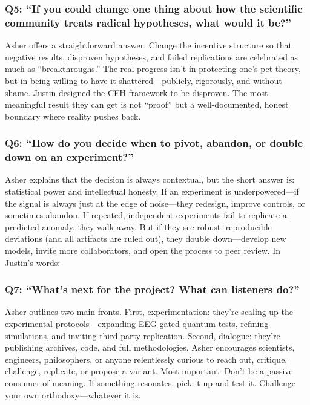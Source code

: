 \documentclass{report}
\begin{document}
\subsubsection*{Q5: ``If you could change one thing about how the scientific community treats radical hypotheses, what would it be?''}
Asher offers a straightforward answer: Change the incentive structure so that negative results, disproven hypotheses, and failed replications are celebrated as much as “breakthroughs.” The real progress isn’t in protecting one’s pet theory, but in being willing to have it shattered—publicly, rigorously, and without shame. Justin designed the CFH framework to be disproven. The most meaningful result they can get is not “proof” but a well-documented, honest boundary where reality pushes back.

\subsubsection*{Q6: ``How do you decide when to pivot, abandon, or double down on an experiment?''}
Asher explains that the decision is always contextual, but the short answer is: statistical power and intellectual honesty. If an experiment is underpowered—if the signal is always just at the edge of noise—they redesign, improve controls, or sometimes abandon. If repeated, independent experiments fail to replicate a predicted anomaly, they walk away. But if they see robust, reproducible deviations (and all artifacts are ruled out), they double down—develop new models, invite more collaborators, and open the process to peer review. In Justin’s words:

\subsubsection*{Q7: ``What’s next for the project? What can listeners do?''}
Asher outlines two main fronts. First, experimentation: they’re scaling up the experimental protocols—expanding EEG-gated quantum tests, refining simulations, and inviting third-party replication. Second, dialogue: they’re publishing archives, code, and full methodologies. Asher encourages scientists, engineers, philosophers, or anyone relentlessly curious to reach out, critique, challenge, replicate, or propose a variant. Most important: Don’t be a passive consumer of meaning. If something resonates, pick it up and test it. Challenge your own orthodoxy—whatever it is.
\end{document}
